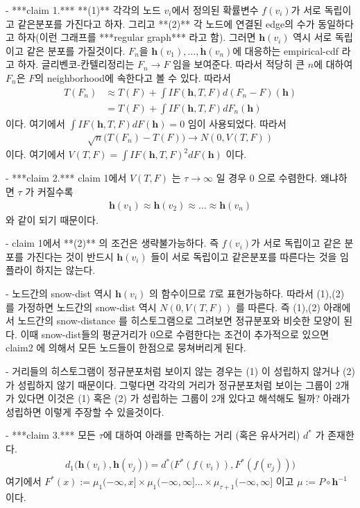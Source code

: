\documentclass[preprint, review, 12pt]{article}
\theoremstyle{definition}
\theoremstyle{remark}
\begin{document}
- ***claim 1.*** **(1)** 각각의 노드 $v_i$에서 정의된 확률변수 $f(v_i)$가 서로 독립이고 같은분포를 가진다고 하자. 그리고 **(2)** 각 노드에 연결된 edge의 수가 동일하다고 하자(이런 그래프를 ***regular graph*** 라고 함). 그러면 $\boldsymbol{h}(v_i)$ 역시 서로 독립이고 같은 분포를 가질것이다. $F_n$을 $\boldsymbol{h}(v_1),\dots,\boldsymbol{\dot h}(v_n)$에 대응하는 empirical-cdf 라고 하자. 글리벤코-칸텔리정리는 $F_n \to F$ 임을 보여준다. 따라서 적당히 큰 $n$에 대하여 $F_n$은 $F$의 neighborhood에 속한다고 볼 수 있다. 따라서 
\begin{align}
T(F_n) & \approx  T(F)+\int IF(\boldsymbol{h},T,F)d(F_n-F)(\boldsymbol{h}) \\
& = T(F)+\int IF(\boldsymbol{h},T,F) dF_n(\boldsymbol{h}) 
\end{align}
이다. 여기에서 $\int IF(\boldsymbol{h},T,F)dF(\boldsymbol{h})=0$ 임이 사용되었다. 따라서 
\begin{align}
\sqrt{n}\Big(T(F_n)-T(F) \Big) \to N(0,V(T,F))
\end{align}
이다. 여기에서 $V(T,F)=\int IF(\boldsymbol{h},T,F)^2 dF(\boldsymbol{h})$ 이다. 

- ***claim 2.*** claim 1에서 $V(T,F)$ 는 $\tau \to \infty$ 일 경우 $0$ 으로 수렴한다. 왜냐하면 $\tau$ 가 커질수록 
\begin{align}
\boldsymbol{h}(v_1)\approx \boldsymbol{h}(v_2) \approx \dots \approx \boldsymbol{h}(v_n)
\end{align}
와 같이 되기 때문이다. 

- claim 1에서 **(2)** 의 조건은 생략불가능하다. 즉 $f(v_i)$가 서로 독립이고 같은 분포를 가진다는 것이 반드시 $\boldsymbol{h}(v_i)$ 들이 서로 독립이고 같은분포를 따른다는 것을 임플라이 하지는 않는다. 

- 노드간의 snow-dist 역시 $\boldsymbol{h}(v_i)$ 의 함수이므로 $T$로 표현가능하다. 따라서 (1),(2) 를 가정하면 노드간의 snow-dist 역시 $N(0,V(T,F))$ 를 따른다. 즉 (1),(2) 아래에서 노드간의 snow-distance 를 히스토그램으로 그려보면 정규분포와 비슷한 모양이 된다. 이때 snow-dist들의 평균거리가 0으로 수렴한다는 조건이 추가적으로 있으면 claim2 에 의해서 모든 노드들이 한점으로 뭉쳐버리게 된다. 

- 거리들의 히스토그램이 정규분포처럼 보이지 않는 경우는 (1) 이 성립하지 않거나 (2) 가 성립하지 않기 때문이다. 그렇다면 각각의 거리가 정규분포처럼 보이는 그룹이 2개가 있다면 이것은 (1) 혹은 (2) 가 성립하는 그룹이 2개 있다고 해석해도 될까? 아래가 성립하면 이렇게 주장할 수 있을것이다. 

- ***claim 3.*** 모든 $\tau$에 대하여 아래를 만족하는 거리 (혹은 유사거리) $d^* $ 가 존재한다. 
\begin{align}
d_1 \big(\boldsymbol{h}(v_i),\boldsymbol{h}(v_j)\big) = d^* \big(F^* (f(v_i)),F^* (f(v_j))\big)
\end{align}
여기에서 $F^* (x) :=\mu_1(-\infty,x]\times \mu_1(-\infty,\infty] \dots \times \mu_{\tau+1}(-\infty,\infty]$ 이고 $\mu:=P \circ {\boldsymbol h}^{-1}$ 이다. 
\end{document}
